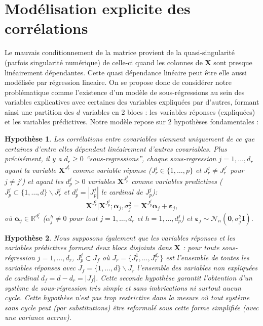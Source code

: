 \documentclass[12pt,a4paper]{report}
\newtheorem{hypfr}{Hypothèse}
\begin{document}
	\section{Modélisation explicite des corrélations}
	Le mauvais conditionnement de la matrice provient de la quasi-singularité (parfois singularité numérique) de celle-ci quand les colonnes de $\boldsymbol{X}$ sont presque linéairement dépendantes. Cette quasi dépendance linéaire peut être elle aussi modélisée par régression lineaire. On se propose donc de considérer notre problématique comme l'existence d'un modèle de sous-régressions au sein des variables explicatives avec certaines des variables expliquées par d'autres, formant ainsi une partition des $d$ variables en 2 blocs : les variables réponses (expliquées) et les variables prédictives. Notre modèle repose sur 2 hypothèses fondamentales :
	

\begin{hypfr}\label{H1fr}
Les corrélations entre covariables viennent uniquement de ce que certaines d'entre elles dépendent linéairement d'autres covariables. Plus précisément, il y a $d_{r}\geq 0$  ``sous-regressions'', chaque sous-regression $j=1,\ldots,d_{r}$ ayant la variable $\boldsymbol{X}^{J_{r}^j}$ comme variable {\it réponse} ($J_{r}^j\in\{1,\ldots,p\}$ et $J_{r}^j\neq J_{r}^{j'}$ pour $j\neq j'$) et ayant les $d_p^j>0$ variables $\boldsymbol{X}^{J_{p}^j}$  comme variables {\it predictives}  ($J_{p}^j\subset\{1,\ldots,d\} \backslash J_{r}^j$ et $d_p^j=|J_{p}^j|$ le cardinal de $J_{p}^j$):
\begin{equation}
\boldsymbol{X}^{J_{r}^j}|\boldsymbol{X}^{J_{p}^j};\boldsymbol{\alpha}_j,\sigma^2_j=\boldsymbol{X}^{J_{p}^j}\boldsymbol{\alpha}_j+\boldsymbol{\varepsilon}_j, \label{eq:SR_fr}
\end{equation}
où $\boldsymbol{\alpha}_j\in{\mathbb{R}^{d_r^j}}$ (${\alpha}_j^h\neq 0$ pour tout $j=1,\ldots,d_r$ et $h=1,\ldots,d_p^j$) et $\boldsymbol{\varepsilon}_j \sim\mathcal{N}_n(\boldsymbol{0},\sigma^2_j\boldsymbol{I})$.
\end{hypfr}

\begin{hypfr}\label{H2fr}
Nous supposons également que les variables réponses et les variables prédictives forment deux blocs disjoints dans $\boldsymbol{X}$ :
 pour toute sous-régression $j=1,\ldots,d_{r}$, $J_{p}^j\subset J_f$ où $J_{r}=\{J_{r}^1,\ldots,J_{r}^{d_r}\}$ est l'ensemble de toutes les variables réponses avec $J_f=\{1,\ldots,d\} \backslash J_{r}$ l'ensemble des variables non expliquées de cardinal $d_f=d-d_r=|J_f|$. Cette seconde hypothèse garantit l'obtention d'un système de sous-régression très simple et sans imbrications ni surtout aucun cycle. Cette hypothèse n'est pas trop restrictive dans la mesure où tout système sans cycle peut (par substitutions) être reformulé sous cette forme simplifiée (avec une variance accrue).
\end{hypfr}
\end{document}
